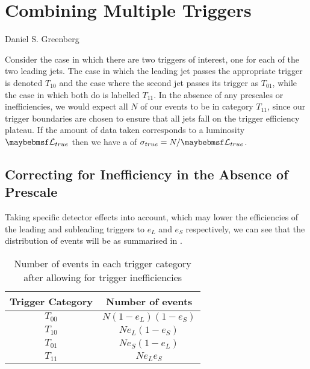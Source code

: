 \chapter{Combining Multiple Triggers}
\label{chap:appendix:trigger_efficiencies}

{Daniel S. Greenberg}

Consider the case in which there are two triggers of interest, one for each of the
two leading jets. The case in which the leading jet passes the appropriate trigger
is denoted $T_{10}$ and the case where the second jet passes its trigger as $T_{01}$,
while the case in which both do is labelled $T_{11}$. In the absence of any prescales
or inefficiencies, we would expect all $N$ of our events to be in category $T_{11}$,
since our trigger boundaries are chosen to ensure that all jets fall on the trigger
efficiency plateau. If the amount of data taken corresponds to a luminosity $\luminosity_{true}$
then we have a \xs of $\sigma_{true} = N / \luminosity_{true}$.

\section{Correcting for Inefficiency in the Absence of Prescale}
Taking specific detector effects into account, which may lower the efficiencies
of the leading and subleading triggers to $e_L$ and $e_S$ respectively, we can see that the distribution
of events will be as summarised in .

\begin{table}
\begin{center}
  \begin{tabular}{ c c }
    Trigger Category & Number of events      \\
    \midrule
    $T_{00}$         & $N(1-e_L)(1-e_S)$ \\
    $T_{10}$         & $N e_L (1-e_S)$   \\ 
    $T_{01}$         & $N e_S (1-e_L)$   \\
    $T_{11}$         & $N e_L e_S$       \\       
  \end{tabular}
  \caption{Number of events in each trigger category after allowing for trigger
           inefficiencies}
  \label{tab:appendix:trig_inefficiencies}
\end{center}
\end{table}

